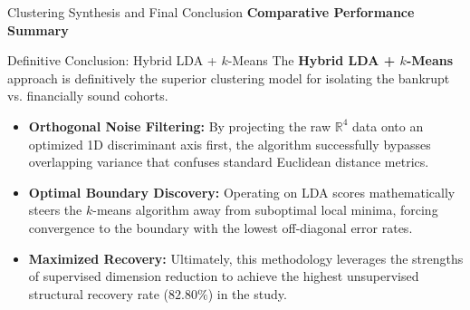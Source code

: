\documentclass[8pt, aspectratio=169]{beamer}
\begin{document}
\begin{frame}{Clustering Synthesis and Final Conclusion}
    \textbf{Comparative Performance Summary}
    \begin{table}
        \centering
    \end{table}

    \vspace{0.3cm}

    \begin{alertblock}{Definitive Conclusion: Hybrid LDA + $k$-Means}
        The \textbf{Hybrid LDA + $k$-Means} approach is definitively the superior clustering model for isolating the bankrupt vs. financially sound cohorts.
        \vspace{0.1cm}
        \begin{itemize}
            \item \textbf{Orthogonal Noise Filtering:} By projecting the raw $\mathbb{R}^4$ data onto an optimized 1D discriminant axis first, the algorithm successfully bypasses overlapping variance that confuses standard Euclidean distance metrics.
            \item \textbf{Optimal Boundary Discovery:} Operating on LDA scores mathematically steers the $k$-means algorithm away from suboptimal local minima, forcing convergence to the boundary with the lowest off-diagonal error rates.
            \item \textbf{Maximized Recovery:} Ultimately, this methodology leverages the strengths of supervised dimension reduction to achieve the highest unsupervised structural recovery rate ($82.80\%$) in the study.
        \end{itemize}
    \end{alertblock}
\end{frame}
\end{document}
